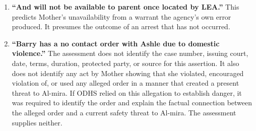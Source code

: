 \documentclass[10pt,a4paper,roman]{moderncv}
\begin{document}
\begin{enumerate}[leftmargin=*,itemsep=0.35em,topsep=0.3em,resume]
\begin{enumerate}[leftmargin=*,itemsep=0.35em,topsep=0.3em,resume]
	\item \textbf{``And will not be available to parent once located by LEA.''} This predicts Mother's unavailability from a warrant the agency's own error produced. It presumes the outcome of an arrest that has not occurred.
	\item \textbf{``Barry has a no contact order with Ashle due to domestic violence.''} The assessment does not identify the case number, issuing court, date, terms, duration, protected party, or source for this assertion. It also does not identify any act by Mother showing that she violated, encouraged violation of, or used any alleged order in a manner that created a present threat to Al-mira. If ODHS relied on this allegation to establish danger, it was required to identify the order and explain the factual connection between the alleged order and a current safety threat to Al-mira. The assessment supplies neither.
\end{enumerate}


\end{enumerate}
\end{document}
